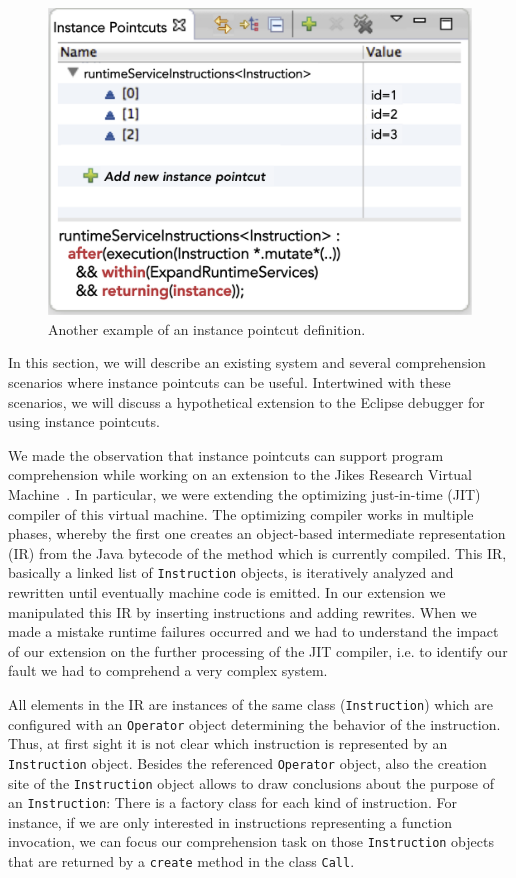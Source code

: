 \begin{figure}[t!]
\begin{minipage}[t]{0.3333\textwidth}
\includegraphics[scale=0.24]{images/runtimeServices.png}
\caption{Another example of an instance pointcut definition.}
\label{fig:ip-view-runtimeServices}
\end{minipage}
\end{figure}

In this section, we will describe an existing system and several comprehension scenarios where instance pointcuts can be useful.
Intertwined with these scenarios, we will discuss a hypothetical extension to the Eclipse debugger for using instance pointcuts.

We made the observation that instance pointcuts can support program comprehension while working on an extension to the Jikes Research Virtual Machine~\cite{Alpern2005}.
In particular, we were extending the optimizing just-in-time (JIT) compiler of this virtual machine.
The optimizing compiler works in multiple phases, whereby the first one creates an object-based intermediate representation (IR) from the Java bytecode of the method which is currently compiled.
This IR, basically a linked list of \lstinline!Instruction! objects, is iteratively analyzed and rewritten until eventually machine code is emitted.
In our extension we manipulated this IR by inserting instructions and adding rewrites.
When we made a mistake runtime failures occurred and we had to understand the impact of our extension on the further processing of the JIT compiler, i.e. to identify our fault we had to comprehend a very complex system.

All elements in the IR are instances of the same class (\lstinline!Instruction!) which are configured with an \lstinline!Operator! object determining the behavior of the instruction.
Thus, at first sight it is not clear which instruction is represented by an \lstinline!Instruction! object.
Besides the referenced \lstinline!Operator! object, also the creation site of the \lstinline!Instruction! object allows to draw conclusions about the purpose of an \lstinline!Instruction!: There is a factory class for each kind of instruction.
For instance, if we are only interested in instructions representing a function invocation, we can focus our comprehension task on those \lstinline!Instruction! objects that are returned by a \lstinline!create! method in the class \lstinline!Call!.

